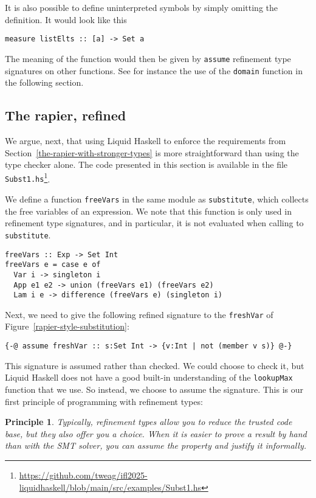 \documentclass[sigconf]{acmart}
\newcommand{\tc}[1]{{\small\texttt{#1}}}
\newcommand{\sourcefile}[1]{\tc{#1}\footnote{\scriptsize\url{https://github.com/tweag/ifl2025-liquidhaskell/blob/main/src/examples/#1}}}
\newtheorem{principle}{Principle}
\begin{document}
It is also possible to define uninterpreted symbols by simply omitting the
definition. It would look like this
\begin{verbatim}
measure listElts :: [a] -> Set a
\end{verbatim}
The meaning of the function would then be given by \tc{assume} refinement
type signatures on other functions. See for instance the use of the \tc{domain}
function in the following section.


\subsection{The rapier, refined}
\label{the-rapier-with-refinement-types}

We argue, next, that using Liquid Haskell to enforce the
requirements from Section~\ref{the-rapier-with-stronger-types} is more
straightforward than using the type checker alone. The code presented in this section is available in the file
\sourcefile{Subst1.hs}.

We define a function \tc{freeVars} in the same module as \tc{subs\-ti\-tute},
which collects the free variables of an expression. We note that this function
is only used in refinement type signatures, and in particular, it is not evaluated
when calling to \tc{substitute}.

\begin{verbatim}
freeVars :: Exp -> Set Int
freeVars e = case e of
  Var i -> singleton i
  App e1 e2 -> union (freeVars e1) (freeVars e2)
  Lam i e -> difference (freeVars e) (singleton i)
\end{verbatim}

Next, we need to give the following refined signature to the \tc{freshVar} of
Figure~\ref{rapier-style-substitution}:
\begin{verbatim}
{-@ assume freshVar :: s:Set Int -> {v:Int | not (member v s)} @-}
\end{verbatim}
This signature is assumed rather than checked. We could choose to check it, but
Liquid Haskell does not have a good built-in understanding of the \tc{lookupMax}
function that we use. So instead, we choose to assume the signature. This is our
first principle of programming with refinement types:

\begin{principle}
\label{assumption-principle}
  Typically, refinement types allow you to reduce the trusted code base, but they also offer
    you a choice. When it is easier to prove a result by
    hand than with the SMT solver, you can assume the property and
    justify it informally.
\end{principle}
\end{document}
